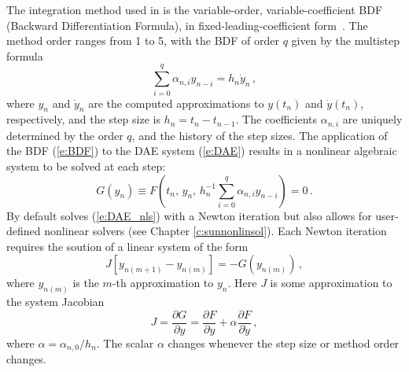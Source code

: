 The integration method used in {\idas} is the variable-order, variable-coefficient
BDF (Backward Differentiation Formula), in fixed-leading-coefficient
form~\cite{BCP:96}.
The method order ranges from 1 to 5, with the BDF of order $q$
given by the multistep formula
\begin{equation}\label{e:BDF}
  \sum_{i=0}^q \alpha_{n,i}y_{n-i} = h_n \dot{y}_n \, ,
\end{equation}
where $y_n$ and $\dot{y}_n$ are the computed approximations to $y(t_n)$
and $\dot{y}(t_n)$, respectively, and the step size is $h_n = t_n - t_{n-1}$.
The coefficients $\alpha_{n,i}$ are uniquely determined by the order
$q$, and the history of the step sizes.  The application of the BDF
(\ref{e:BDF}) to the DAE system (\ref{e:DAE}) results in a nonlinear
algebraic system to be solved at each step:
\begin{equation}\label{e:DAE_nls}
  G(y_n) \equiv
  F \left( t_n , \, y_n , \,
    h_n^{-1} \sum_{i=0}^q \alpha_{n,i}y_{n-i} \right) = 0 \, .
\end{equation}
%
By default {\idas} solves (\ref{e:DAE_nls}) with a Newton iteration but {\idas}
also allows for user-defined nonlinear solvers (see Chapter
\ref{c:sunnonlinsol}). Each Newton iteration requires the soution of a linear
system of the form
\begin{equation}\label{e:DAE_Newtoncorr}
  J [y_{n(m+1)} - y_{n(m)}] = -G(y_{n(m)})  \, ,
\end{equation}
where $y_{n(m)}$ is the $m$-th approximation to $y_n$.
%
Here $J$ is some approximation to the system Jacobian
\begin{equation}\label{e:DAE_Jacobian}
  J = \frac{\partial G}{\partial y}
  = \frac{\partial F}{\partial y} +
  \alpha\frac{\partial F}{\partial \dot{y}} \, ,
\end{equation}
where $\alpha = \alpha_{n,0}/h_n$. The scalar $\alpha$ changes
whenever the step size or method order changes.

